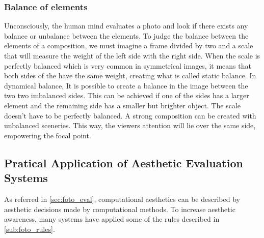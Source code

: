 \subsubsection{Balance of elements}
\label{subsub:balance_elements}

Unconsciously, the human mind evaluates a photo and look if there exists any balance or unbalance between the elements.
To judge the balance between the elements of a composition, we must imagine a frame divided by two and a scale that will measure the weight of the left side with the right side.
When the scale is perfectly balanced which is very common in symmetrical images, it means that both sides of the have the same weight, creating what is called static balance.
In dynamical balance, It is possible to create a balance in the image between the two two imbalanced sides. This can be achieved if one of the sides has a larger element and the remaining side has a smaller but brighter object.
The scale doesn’t have to be perfectly balanced. A strong composition can be created with unbalanced sceneries. This way, the viewers attention will lie over the same side, empowering the focal point.


\subsection{Pratical Application of Aesthetic Evaluation Systems}
\label{subsub:eval_applications}

As referred in \ref{sec:foto_eval}, computational aesthetics can be described by aesthetic decisions made by computational methods. 
To increase aesthetic awareness, many systems have applied some of the rules described in \ref{sub:foto_rules}.